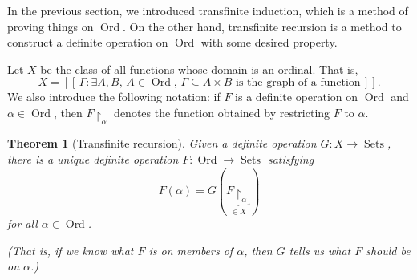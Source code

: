 \documentclass[10pt]{article}
\DeclareMathOperator{\Sets}{Sets}
\DeclareMathOperator{\Ord}{Ord}
\theoremstyle{newstyle}
\newtheorem{thm}{Theorem}[section]
\begin{document}
In the previous section, we introduced transfinite induction, which is a method of proving 
things on $\Ord$. On the other hand, transfinite recursion is a method to construct a definite operation on $\Ord$ with some desired property.

Let $X$ be the class of all functions whose domain is an ordinal. That is, 
\[ X = [[ \, \Gamma : \exists A, B,\, A \in \Ord,\, \Gamma \subseteq A \times B \text{ is the 
graph of a function}\,]]. \]
We also introduce the following notation: if $F$ is a definite operation on $\Ord$ and 
$\alpha \in \Ord$, then $F \upharpoonright_\alpha$ denotes the function obtained by restricting 
$F$ to $\alpha$. 

\begin{thm}[Transfinite recursion] 
Given a definite operation $G : X \to \Sets$, there is a unique definite operation $F : \Ord 
\to \Sets$ satisfying 
\[ F(\alpha) = G(\underbrace{F \upharpoonright_\alpha}_{\in X}) \]
for all $\alpha \in \Ord$. 

(That is, if we know what $F$ is on members of $\alpha$, then $G$ tells us what $F$ should be 
on $\alpha$.)
\end{thm}
\end{document}
